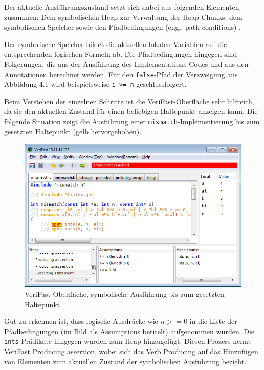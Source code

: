 Der aktuelle Ausführungszustand setzt sich dabei aus folgenden Elementen zusammen: 
Dem symbolischen Heap zur Verwaltung der Heap-Chunks, dem symbolischen Speicher sowie den Pfadbedingungen
(engl. path conditions) \cite[Kap. 2]{jacobs-2010}. 

Der symbolische Speicher bildet die aktuellen lokalen Variablen auf die entsprechenden logischen Formeln ab.
Die Pfadbedingungen hingegen sind Folgerungen, die aus der Ausführung des Implementations-Codes und aus den Annotationen
berechnet werden. Für den \texttt{false}-Pfad der Verzweigung aus Abbildung 4.1 wird beispielsweise
\lstinline{i >= n} geschlussfolgert.

Beim Verstehen der einzelnen Schritte ist die VeriFast-Oberfläche sehr hilfreich, da sie den aktuellen
Zustand für einen beliebigen Haltepunkt anzeigen kann. Die folgende Situation zeigt die Ausführung
einer \lstinline{mismatch}-Implementierung bis zum gesetzten Haltepunkt (gelb hervorgehoben).

\begin{figure}[ht]
\centering
\includegraphics[width=1.0\textwidth]{images/VeriFast-state-after-precondition.png}
\caption{VeriFast-Oberfläche, symbolische Ausführung bis zum gesetzten Haltepunkt}
\end{figure}

Gut zu erkennen ist, dass logische Ausdrücke wie \(n >= 0\) in die Liste der Pfadbedingungen 
(im Bild als \glqq Assumptions\grqq{} betitelt) aufgenommen wurden. Die \lstinline{ints}-Prädikate hingegen
wurden zum Heap hinzugefügt. Diesen Prozess nennt VeriFast \glqq Producing assertion\grqq, wobei sich das Verb
\glqq Producing\grqq{} auf das Hinzufügen von Elementen zum aktuellen Zustand der symbolischen Ausführung
bezieht.

